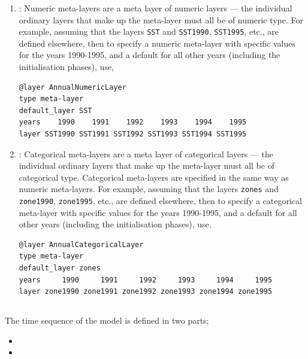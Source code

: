 \begin{enumerate}
\begin{enumerate}

\item {\label{numeric meta-layer}}: Numeric meta-layers are a meta layer of numeric layers --- the individual ordinary layers that make up the meta-layer must all be of numeric type. For example, assuming that the layers \texttt{SST} and \texttt{SST1990}, \texttt{SST1995}, etc., are defined elsewhere, then to specify a numeric meta-layer with specific values for the years 1990-1995, and a default for all other years (including the initialisation phases), use, 

{\small{\begin{verbatim}
@layer AnnualNumericLayer
type meta-layer
default_layer SST
years    1990    1991    1992    1993    1994    1995
layer SST1990 SST1991 SST1992 SST1993 SST1994 SST1995
\end{verbatim}}}

\item {\label{categorical meta-layer}}: Categorical meta-layers are a meta layer of categorical layers --- the individual ordinary layers that make up the meta-layer must all be of categorical type. Categorical meta-layers are specified in the same way as numeric meta-layers. For example, assuming that the layers \texttt{zones} and \texttt{zone1990}, \texttt{zone1995}, etc., are defined elsewhere, then to specify a categorical meta-layer with specific values for the years 1990-1995, and a default for all other years (including the initialisation phases), use, 

{\small{\begin{verbatim}
@layer AnnualCategoricalLayer
type meta-layer
default_layer zones
years     1990     1991     1992     1993     1994     1995
layer zone1990 zone1991 zone1992 zone1993 zone1994 zone1995
\end{verbatim}}}
\end{enumerate}
\end{enumerate}

\subsection{}

The time sequence of the model is defined in two parts;
\begin{itemize}
  \item {}
  \item {}
\end{itemize}

